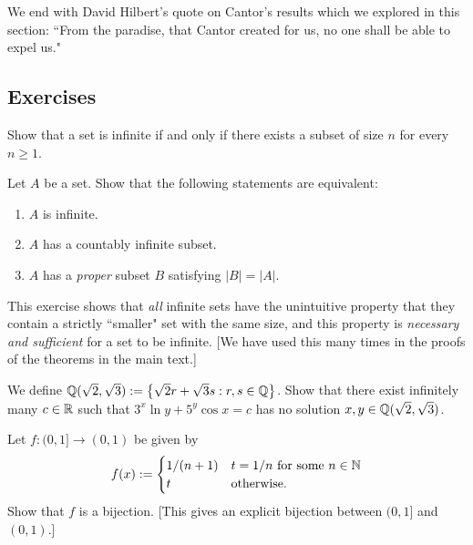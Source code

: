 \documentclass{article}
\begin{document}
We end with David Hilbert's quote on Cantor's results which we explored in this section: ``From the paradise, that Cantor created for us, no one shall be able to expel us."

\newpage
\subsection*{Exercises}
\begin{exercise}
Show that a set is infinite if and only if there exists a subset of size $n$ for every $n\geq 1$.
\end{exercise}

\begin{exercise}
Let $A$ be a set. Show that the following statements are equivalent:
\begin{enumerate}
    \item $A$ is infinite.
    \item $A$ has a countably infinite subset.
    \item $A$ has a \textit{proper} subset $B$ satisfying $|B| = |A|$.
\end{enumerate}
This exercise shows that \textit{all} infinite sets have the unintuitive property that they contain a strictly ``smaller" set with the same size, and this property is \textit{necessary and sufficient} for a set to be infinite. [We have used this many times in the proofs of the theorems in the main text.]
\end{exercise}

\begin{exercise}
We define $\mathbb Q(\sqrt 2, \sqrt 3) := \left\{\sqrt 2r + \sqrt 3s: r,s\in \mathbb Q\right\}$. Show that there exist infinitely many $c\in\mathbb R$ such that $3^x\ln y + 5^y\cos x = c$ has no solution $x,y\in\mathbb Q(\sqrt 2,\sqrt 3)$.
\end{exercise}

\begin{exercise}
Let $f: (0, 1]\to (0,1)$ be given by
$$f(x) := \begin{cases}
1/(n+1) & t=1/n \textrm{ for some } n\in\mathbb N \\
t & \textrm{otherwise.}
\end{cases}$$
Show that $f$ is a bijection. [This gives an explicit bijection between $(0, 1]$ and $(0, 1)$.]
\end{exercise}
\end{document}
